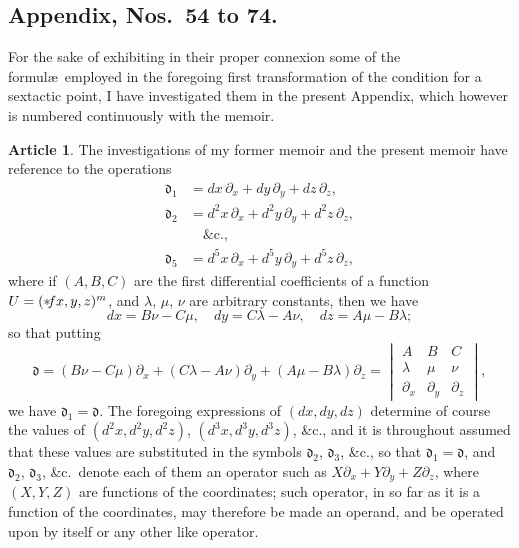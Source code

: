 \documentclass[12pt,a4paper]{article}
\theoremstyle{definition}
\newtheorem{art}{Article}[section]
\begin{document}
\subsection*{Appendix, Nos.\ 54 to 74.}

For the sake of exhibiting in their proper connexion some of the formul\ae\ employed in the foregoing first transformation of the condition for a sextactic point, I have investigated them in the present Appendix, which however is numbered continuously with the memoir.

\begin{art}
The investigations of my former memoir and the present memoir have reference to the operations
\begin{align*}
\mathfrak{d}_1 &= dx\,\partial_x + dy\,\partial_y + dz\,\partial_z, \\
\mathfrak{d}_2 &= d^2x\,\partial_x + d^2y\,\partial_y + d^2z\,\partial_z, \\
&\quad \&\text{c.}, \\
\mathfrak{d}_5 &= d^5x\,\partial_x + d^5y\,\partial_y + d^5z\,\partial_z,
\end{align*}
where if $(A, B, C)$ are the first differential coefficients of a function $U = (* \hspace{-2pt} fx, y, z)^m$, and $\lambda$, $\mu$, $\nu$ are arbitrary constants, then we have
\[
dx = B\nu - C\mu, \quad dy = C\lambda - A\nu, \quad dz = A\mu - B\lambda;
\]
so that putting
\[
\mathfrak{d} = (B\nu - C\mu)\partial_x + (C\lambda - A\nu)\partial_y + (A\mu - B\lambda)\partial_z = \begin{vmatrix} A & B & C \\ \lambda & \mu & \nu \\ \partial_x & \partial_y & \partial_z \end{vmatrix},
\]
we have $\mathfrak{d}_1 = \mathfrak{d}$. The foregoing expressions of $(dx, dy, dz)$ determine of course the values of $(d^2x, d^2y, d^2z)$, $(d^3x, d^3y, d^3z)$, \&c., and it is throughout assumed that these values are substituted in the symbols $\mathfrak{d}_2$, $\mathfrak{d}_3$, \&c., so that $\mathfrak{d}_1 = \mathfrak{d}$, and $\mathfrak{d}_2$, $\mathfrak{d}_3$, \&c.\ denote each of them an operator such as $X\partial_x + Y\partial_y + Z\partial_z$, where $(X, Y, Z)$ are functions of the coordinates; such operator, in so far as it is a function of the coordinates, may therefore be made an operand, and be operated upon by itself or any other like operator.
\end{art}
\end{document}
